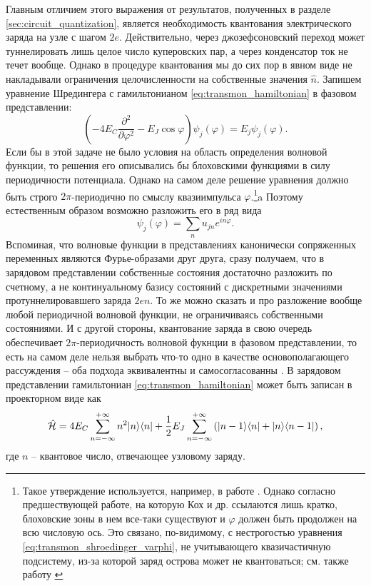 \documentclass[14pt, a4paper]{extreport}
\DeclarePairedDelimiter\bra{\langle}{\rvert}
\DeclarePairedDelimiter\ket{\lvert}{\rangle}
\numberwithin{equation}{section}
\begin{document}
Главным отличием этого выражения от результатов, полученных в разделе \ref{sec:circuit_quantization}, является необходимость квантования электрического заряда на узле с шагом $2e$. Действительно, через джозефсоновский переход может туннелировать лишь целое число куперовских пар, а через конденсатор ток не течет вообще. Однако в процедуре квантования мы до сих пор в явном виде не накладывали ограничения целочисленности на собственные значения $\hat n$. Запишем уравнение Шредингера с гамильтонианом \eqref{eq:transmon_hamiltonian} в фазовом представлении:
\begin{equation}
	\left(- 4 E_C \frac{\partial^2}{\partial \varphi^2} - E_J \cos \varphi\right)\psi_j(\varphi) = E_j \psi_j(\varphi).\label{eq:transmon_shroedinger_varphi}
\end{equation}
Если бы в этой задаче не было условия на область определения волновой функции, то решения его описывались бы блоховскими функциями в силу периодичности потенциала. Однако на самом деле решение уравнения должно быть строго $2\pi$-периодично по смыслу квазиимпульса $\varphi$.\footnote{Такое утверждение используется, например, в работе \cite{koch2007charge}. Однако согласно предшествующей работе, на которую Кох и др. ссылаются лишь кратко, блоховские зоны в нем все-таки существуют \cite{averin1985bloch} и $\varphi$ должен быть продолжен на всю числовую ось. Это связано, по-видимому, с нестрогостью уравнения \eqref{eq:transmon_shroedinger_varphi}, не учитывающего квазичастичную подсистему, из-за которой заряд острова может не квантоваться; см. также работу \cite{devoret2021does}}a Поэтому естественным образом возможно разложить его в ряд вида
\begin{equation}
	\psi_j (\varphi) = \sum_n u_{jn} e^{i n \varphi}.
\end{equation}
Вспоминая, что волновые функции в представлениях канонически сопряженных переменных являются Фурье-образами друг друга, сразу получаем, что в зарядовом представлении собственные состояния достаточно разложить по счетному, а не континуальному базису состояний с дискретными значениями протуннелировавшего заряда $2en$. То же можно сказать и про разложение вообще любой периодичной волновой функции, не ограничиваясь собственными состояниями. И с другой стороны, квантование заряда в свою очередь обеспечивает $2\pi$-периодичность волновой фукнции в фазовом представлении, то есть на самом деле нельзя выбрать что-то одно в качестве основополагающего рассуждения -- оба подхода эквивалентны и самосогласованны \cite{thuneberg2013, devoret1995quantum}. В зарядовом представлении гамильтониан \eqref{eq:transmon_hamiltonian} может быть записан в проекторном виде как \cite{devoret1995quantum}
\begin{equation}
	\hat{\mathcal{H}} = 4 E_C \sum_{n=-\infty}^{+\infty} n^2 \ket{n}\bra{n} + \frac{1}{2}E_J \sum_{n=-\infty}^{+\infty} \left( \ket{n-1}\bra{n} + \ket{n}\bra{n-1} \right),\label{eq:transmon_shroedinger_n}
\end{equation}
где $n$ -- квантовое число, отвечающее узловому заряду.
\end{document}
